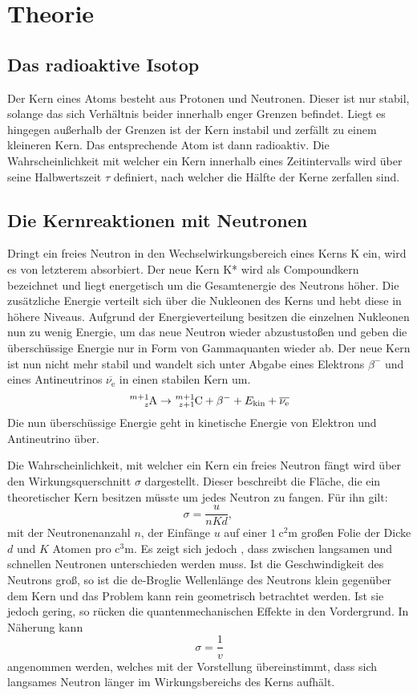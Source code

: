 
\section{Theorie}
\label{sec:Theorie}
\subsection{Das radioaktive Isotop}
Der Kern eines Atoms besteht aus Protonen und Neutronen. Dieser ist nur stabil, solange das sich Verhältnis beider innerhalb enger Grenzen befindet. Liegt es hingegen außerhalb der Grenzen ist der Kern instabil und zerfällt zu einem kleineren Kern. Das entsprechende Atom ist dann radioaktiv. Die Wahrscheinlichkeit mit welcher ein Kern innerhalb eines Zeitintervalls wird über seine Halbwertszeit $\tau$ definiert, nach welcher die Hälfte der Kerne zerfallen sind.

\subsection{Die Kernreaktionen mit Neutronen}
Dringt ein freies Neutron in den Wechselwirkungsbereich eines Kerns K ein, wird es von letzterem absorbiert. Der neue Kern K* wird als Compoundkern bezeichnet und liegt energetisch um die Gesamtenergie des Neutrons höher. Die zusätzliche Energie verteilt sich über die Nukleonen des Kerns und hebt diese in höhere Niveaus. Aufgrund der Energieverteilung besitzen die einzelnen Nukleonen nun zu wenig Energie, um das neue Neutron wieder abzustustoßen und geben die überschüssige Energie nur in Form von Gammaquanten wieder ab. Der neue Kern ist nun nicht mehr stabil und wandelt sich unter Abgabe eines Elektrons $\beta^-$ und eines Antineutrinos $\overline{\nu_\text{e}}$ in einen stabilen Kern um.
\begin{equation}
  \ce{^{m+1}_{z}A} \rightarrow \ce{^{m+1}_{z+1}C} + \beta^-  + E_\text{kin} + \overline{\nu_\text{e}}
\end{equation}
 Die nun überschüssige Energie geht in kinetische Energie von Elektron und Antineutrino über.


Die Wahrscheinlichkeit, mit welcher ein Kern ein freies Neutron fängt wird über den Wirkungsquerschnitt $\sigma$ dargestellt. Dieser beschreibt die Fläche, die ein theoretischer Kern besitzen müsste um jedes Neutron zu fangen. Für ihn gilt:
\begin{equation}
  \sigma = \frac{u}{n K d}\text{, }
\end{equation}
mit der Neutronenanzahl $n$, der Einfänge $u$ auf einer $\SI{1}{\square\centi\meter}$ großen Folie der Dicke $d$ und $K$ Atomen pro $\si{\cubic\centi\meter}$.
 Es zeigt sich jedoch , dass zwischen langsamen und schnellen Neutronen unterschieden werden muss. Ist die Geschwindigkeit des Neutrons groß, so ist die de-Broglie Wellenlänge des Neutrons klein gegenüber dem Kern und das Problem kann rein geometrisch betrachtet werden. Ist sie jedoch gering, so rücken die quantenmechanischen Effekte in den Vordergrund. In Näherung kann
 \begin{equation}
   \sigma = \frac{1}{v}
 \end{equation}
 angenommen werden, welches mit der Vorstellung übereinstimmt, dass sich langsames Neutron länger im Wirkungsbereichs des Kerns aufhält.
